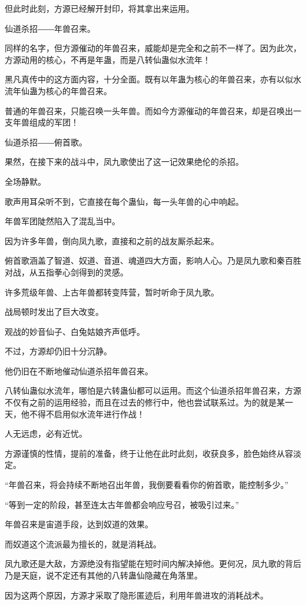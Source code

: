 \begin{this_body}
但此时此刻，方源已经解开封印，将其拿出来运用。

仙道杀招――年兽召来。

同样的名字，但方源催动的年兽召来，威能却是完全和之前不一样了。因为此次，方源动用的核心，不再是年蛊，而是八转仙蛊似水流年！

黑凡真传中的这方面内容，十分全面。既有以年蛊为核心的年兽召来，亦有以似水流年仙蛊为核心的年兽召来。

普通的年兽召来，只能召唤一头年兽。而如今方源催动的年兽召来，却是召唤出一支年兽组成的军团！

仙道杀招――俯首歌。

果然，在接下来的战斗中，凤九歌使出了这一记效果绝伦的杀招。

全场静默。

歌声用耳朵听不到，它直接在每个蛊仙，每一头年兽的心中响起。

年兽军团陡然陷入了混乱当中。

因为许多年兽，倒向凤九歌，直接和之前的战友厮杀起来。

俯首歌涵盖了智道、奴道、音道、魂道四大方面，影响人心。乃是凤九歌和秦百胜对战，从五指拳心剑得到的灵感。

许多荒级年兽、上古年兽都转变阵营，暂时听命于凤九歌。

战局顿时发出了巨大改变。

观战的妙音仙子、白兔姑娘齐声低呼。

不过，方源却仍旧十分沉静。

他仍旧在不断地催动仙道杀招年兽召来。

八转仙蛊似水流年，哪怕是六转蛊仙都可以运用。而这个仙道杀招年兽召来，方源不仅有之前的运用经验，而且在过去的修行中，他也尝试联系过。为的就是某一天，他不得不启用似水流年进行作战！

人无远虑，必有近忧。

方源谨慎的性情，提前的准备，终于让他在此时此刻，收获良多，脸色始终从容淡定。

“年兽召来，将会持续不断地召出年兽，我倒要看看你的俯首歌，能控制多少。”

“等到一定的阶段，甚至连太古年兽都会响应号召，被吸引过来。”

年兽召来是宙道手段，达到奴道的效果。

而奴道这个流派最为擅长的，就是消耗战。

凤九歌还是大敌，方源绝没有指望能在短时间内解决掉他。更何况，凤九歌的背后乃是天庭，说不定还有其他的八转蛊仙隐藏在角落里。

因为这两个原因，方源才采取了隐形匿迹后，利用年兽进攻的消耗战术。


\end{this_body}
